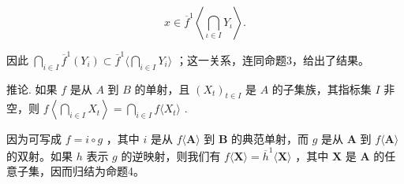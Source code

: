 \[
x \in \overline {{f}} ^ {1} \left\langle \bigcap_ {\iota \in I} Y _ {\iota} \right\rangle .
\]

因此 \(\bigcap_{i\in I}\overline{f}^{1}(Y_{i})\subset\overline{f}^{1}\Big\langle\bigcap_{i\in I}Y_{i}\Big\rangle\) ；这一关系，连同命题3，给出了结果。

推论. 如果 \(f\) 是从 \(A\) 到 \(B\) 的单射，且 \((X_{t})_{t \in I}\) 是 \(A\) 的子集族，其指标集 \(I\) 非空，则 \(f\left\langle \bigcap_{i \in I} X_{t} \right\rangle = \bigcap_{i \in I} f\langle X_{t} \rangle\) .

因为可写成 \(f = i \circ g\) ，其中 \(i\) 是从 \(f\langle \mathbf{A} \rangle\) 到 \(\mathbf{B}\) 的典范单射，而 \(g\) 是从 \(\mathbf{A}\) 到 \(f\langle \mathbf{A} \rangle\) 的双射。如果 \(h\) 表示 \(g\) 的逆映射，则我们有 \(f\langle \mathbf{X} \rangle = \overline{h}^1\langle \mathbf{X} \rangle\) ，其中 \(\mathbf{X}\) 是 \(\mathbf{A}\) 的任意子集，因而归结为命题4。


